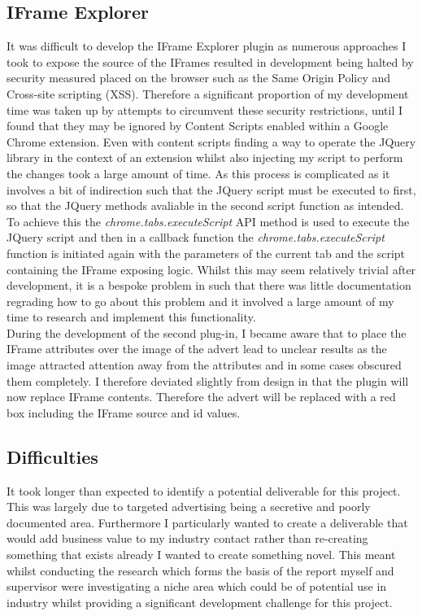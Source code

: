 \documentclass[12pt]{article}
\begin{document}
\subsection{IFrame Explorer}
It was difficult to develop the IFrame Explorer plugin as numerous approaches I took to expose the source of the IFrames resulted in development being halted by security measured  placed on the browser such as the Same Origin Policy and Cross-site scripting (XSS). Therefore a significant proportion of my development time was taken up by attempts to circumvent these security restrictions, until I found that they may be ignored by Content Scripts enabled within a Google Chrome extension. Even with content scripts finding a way to operate the JQuery library in the context of an extension whilst also injecting my script to perform the changes took a large amount of time. As this process is complicated as it involves a bit of indirection such that the JQuery script must be executed to first, so that the JQuery methods avaliable in the second script function as intended. To achieve this the \textit{chrome.tabs.executeScript} API method is used to execute the JQuery script and then in a callback function the \textit{chrome.tabs.executeScript} function is initiated again with the parameters of the current tab and the script containing the IFrame exposing logic. Whilst this may seem relatively trivial after development, it is a bespoke problem in such that there was little documentation regrading how to go about this problem and it involved a large amount of my time to research and implement this functionality. \\

During the development of the second plug-in, I became aware that to place the IFrame attributes over the image of the advert lead to unclear results as the image attracted attention away from the attributes and in some cases obscured them completely. I therefore deviated slightly from design in that the plugin will now replace IFrame contents. Therefore the advert will be replaced with a red box including the IFrame source and id values. 

\subsection{Difficulties}
It took longer than expected to identify a potential deliverable for this project. This was largely  due to targeted advertising being a secretive and poorly documented area. Furthermore I particularly wanted to create a deliverable that would add business value to my industry contact rather than re-creating something that exists already I wanted to create something novel. This meant whilst conducting the research which forms the basis of the report myself and supervisor were investigating a niche area which could be of potential use in industry whilst providing a significant development challenge for this project. \\
\end{document}

